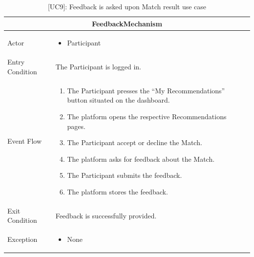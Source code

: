 \begin{table}[H]
    \centering
    \begin{tabular}{|p{3cm}|p{12cm}|}
    \hline
    \multicolumn{2}{|c|}{\textbf{FeedbackMechanism}} \\ \hline
    Actor & 
    \begin{itemize}
        \item Participant
    \end{itemize}\\ \hline
    Entry Condition & The Participant is logged in. \\ \hline
    Event Flow &      
    \begin{enumerate}         
        \item The Participant presses the “My Recommendations” button situated on the dashboard.
        \item The platform opens the respective Recommendations pages.
        \item The Participant accept or decline the Match.
        \item The platform asks for feedback about the Match.
        \item The Participant submits the feedback.
        \item The platform stores the feedback.
    \end{enumerate} \\ \hline
    Exit Condition & Feedback is successfully provided. \\ \hline
    Exception & 
    \begin{itemize}     
        \item None
    \end{itemize} \\ \hline
    \end{tabular}
    \caption{[UC9]: Feedback is asked upon Match result use case}
    \label{tab:UC9}
\end{table}

